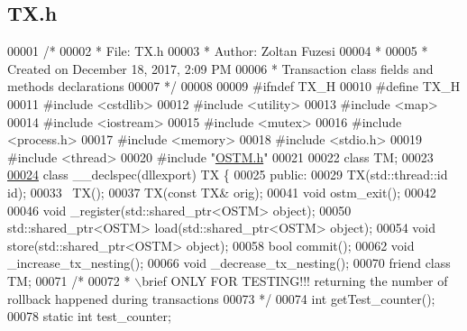 \hypertarget{_t_x_8h_source}{}\subsection{T\+X.\+h}

\begin{DoxyCode}
00001 \textcolor{comment}{/* }
00002 \textcolor{comment}{ * File:   TX.h}
00003 \textcolor{comment}{ * Author: Zoltan Fuzesi}
00004 \textcolor{comment}{ * }
00005 \textcolor{comment}{ * Created on December 18, 2017, 2:09 PM}
00006 \textcolor{comment}{ * Transaction class fields and methods declarations}
00007 \textcolor{comment}{ */}
00008 
00009 \textcolor{preprocessor}{#ifndef TX\_H}
00010 \textcolor{preprocessor}{#define TX\_H}
00011 \textcolor{preprocessor}{#include <cstdlib>}
00012 \textcolor{preprocessor}{#include <utility>}
00013 \textcolor{preprocessor}{#include <map>}
00014 \textcolor{preprocessor}{#include <iostream>}
00015 \textcolor{preprocessor}{#include <mutex>}
00016 \textcolor{preprocessor}{#include <process.h>} 
00017 \textcolor{preprocessor}{#include <memory>}
00018 \textcolor{preprocessor}{#include <stdio.h>}
00019 \textcolor{preprocessor}{#include <thread>}
00020 \textcolor{preprocessor}{#include "\hyperlink{_o_s_t_m_8h}{OSTM.h}"}
00021 
00022 \textcolor{keyword}{class }TM;
00023 
\hypertarget{_t_x_8h_source.tex_l00024}{}\hyperlink{_t_x_8h_aff6924a1418627017270c5afe0db9399}{00024} \textcolor{keyword}{class }\textcolor{keyword}{\_\_declspec(dllexport)} TX \{
00025 \textcolor{keyword}{public}:
00029     TX(std::thread::id \textcolor{keywordtype}{id});
00033     ~TX();
00037     TX(\textcolor{keyword}{const} TX& orig);
00041     \textcolor{keywordtype}{void} ostm\_exit();
00042     
00046     \textcolor{keywordtype}{void} \_register(std::shared\_ptr<OSTM>  \textcolor{keywordtype}{object});
00050     std::shared\_ptr<OSTM>  load(std::shared\_ptr<OSTM>  \textcolor{keywordtype}{object});
00054     \textcolor{keywordtype}{void} store(std::shared\_ptr<OSTM>  \textcolor{keywordtype}{object});
00058     \textcolor{keywordtype}{bool} commit();
00062     \textcolor{keywordtype}{void} \_increase\_tx\_nesting();
00066     \textcolor{keywordtype}{void} \_decrease\_tx\_nesting();
00070     \textcolor{keyword}{friend} \textcolor{keyword}{class }TM;
00071     \textcolor{comment}{/*}
00072 \textcolor{comment}{     * \(\backslash\)brief ONLY FOR TESTING!!! returning the number of rollback happened during transactions}
00073 \textcolor{comment}{     */}
00074     \textcolor{keywordtype}{int} getTest\_counter();
00078     \textcolor{keyword}{static} \textcolor{keywordtype}{int} test\_counter;

\end{DoxyCode}
